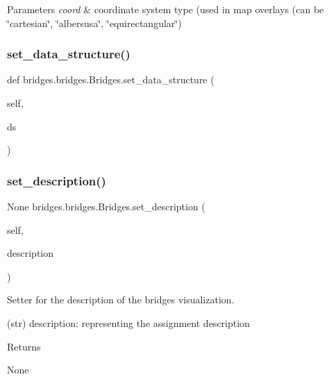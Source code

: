 \begin{DoxyParams}{Parameters}
{\em coord} & coordinate system type (used in map overlays (can be \char`\"{}cartesian\char`\"{}, \char`\"{}albersusa\char`\"{}, \char`\"{}equirectangular\char`\"{}) \\
\hline
\end{DoxyParams}
\mbox{\label{classbridges_1_1bridges_1_1_bridges_a868f02fa66c87c1a1fc7bd6fbc799291}} 
\subsubsection{\texorpdfstring{set\_data\_structure()}{set\_data\_structure()}}
{\footnotesize\ttfamily def bridges.\+bridges.\+Bridges.\+set\+\_\+data\+\_\+structure (\begin{DoxyParamCaption}\item[{}]{self,  }\item[{}]{ds }\end{DoxyParamCaption})}

\mbox{\label{classbridges_1_1bridges_1_1_bridges_ac61a47f230c8f96f85d810498fad8b97}} 
\subsubsection{\texorpdfstring{set\_description()}{set\_description()}}
{\footnotesize\ttfamily  None bridges.\+bridges.\+Bridges.\+set\+\_\+description (\begin{DoxyParamCaption}\item[{}]{self,  }\item[{}]{description }\end{DoxyParamCaption})}



Setter for the description of the bridges visualization. 

\begin{DoxyVerb}       (str) description: representing the assignment description
\end{DoxyVerb}
 \begin{DoxyReturn}{Returns}


None 
\end{DoxyReturn}
\mbox{\label{classbridges_1_1bridges_1_1_bridges_ae9ed34b5878d9d120949da0b7e4d2911}} 
